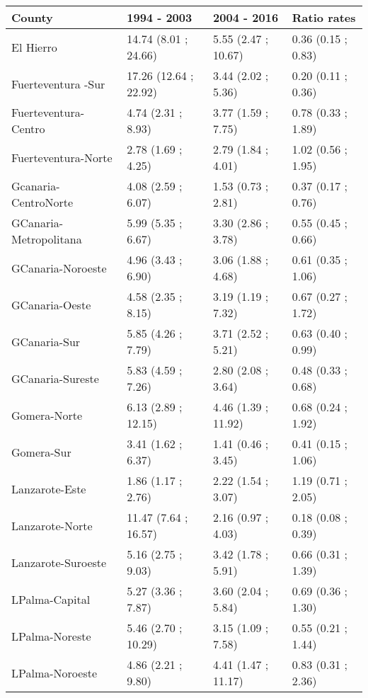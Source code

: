\begin{table}[ht]
\centering
\begin{tabular}{llll}
  \hline
County & 1994 - 2003 & 2004 - 2016 & Ratio rates \\ 
  \hline
El Hierro  & 14.74 (8.01 ; 24.66) & 5.55 (2.47 ; 10.67) & 0.36 (0.15 ; 0.83) \\ 
  Fuerteventura -Sur & 17.26 (12.64 ; 22.92) & 3.44 (2.02 ; 5.36) & 0.20 (0.11 ; 0.36) \\ 
  Fuerteventura-Centro  & 4.74 (2.31 ; 8.93) & 3.77 (1.59 ; 7.75) & 0.78 (0.33 ; 1.89) \\ 
  Fuerteventura-Norte & 2.78 (1.69 ; 4.25) & 2.79 (1.84 ; 4.01) & 1.02 (0.56 ; 1.95) \\ 
  Gcanaria-CentroNorte  & 4.08 (2.59 ; 6.07) & 1.53 (0.73 ; 2.81) & 0.37 (0.17 ; 0.76) \\ 
  GCanaria-Metropolitana & 5.99 (5.35 ; 6.67) & 3.30 (2.86 ; 3.78) & 0.55 (0.45 ; 0.66) \\ 
  GCanaria-Noroeste & 4.96 (3.43 ; 6.90) & 3.06 (1.88 ; 4.68) & 0.61 (0.35 ; 1.06) \\ 
  GCanaria-Oeste  & 4.58 (2.35 ; 8.15) & 3.19 (1.19 ; 7.32) & 0.67 (0.27 ; 1.72) \\ 
  GCanaria-Sur  & 5.85 (4.26 ; 7.79) & 3.71 (2.52 ; 5.21) & 0.63 (0.40 ; 0.99) \\ 
  GCanaria-Sureste & 5.83 (4.59 ; 7.26) & 2.80 (2.08 ; 3.64) & 0.48 (0.33 ; 0.68) \\ 
  Gomera-Norte & 6.13 (2.89 ; 12.15) & 4.46 (1.39 ; 11.92) & 0.68 (0.24 ; 1.92) \\ 
  Gomera-Sur & 3.41 (1.62 ; 6.37) & 1.41 (0.46 ; 3.45) & 0.41 (0.15 ; 1.06) \\ 
  Lanzarote-Este  & 1.86 (1.17 ; 2.76) & 2.22 (1.54 ; 3.07) & 1.19 (0.71 ; 2.05) \\ 
  Lanzarote-Norte  & 11.47 (7.64 ; 16.57) & 2.16 (0.97 ; 4.03) & 0.18 (0.08 ; 0.39) \\ 
  Lanzarote-Suroeste  & 5.16 (2.75 ; 9.03) & 3.42 (1.78 ; 5.91) & 0.66 (0.31 ; 1.39) \\ 
  LPalma-Capital  & 5.27 (3.36 ; 7.87) & 3.60 (2.04 ; 5.84) & 0.69 (0.36 ; 1.30) \\ 
  LPalma-Noreste  & 5.46 (2.70 ; 10.29) & 3.15 (1.09 ; 7.58) & 0.55 (0.21 ; 1.44) \\ 
  LPalma-Noroeste  & 4.86 (2.21 ; 9.80) & 4.41 (1.47 ; 11.17) & 0.83 (0.31 ; 2.36) \\ 

\end{tabular}
\end{table}
